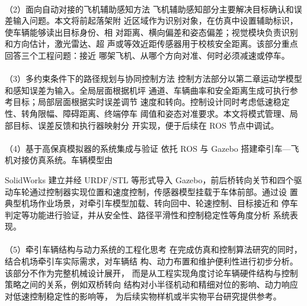 \paragraph{} （2）面向自动对接的飞机辅助感知方法
飞机辅助感知部分主要解决目标确认和误差输入问题。本文将前起落架附
近区域作为识别对象，在仿真中设置辅助标识，使车辆能够读出目标身份、相
对距离、横向偏差和姿态偏差；视觉模块负责识别和方向估计，激光雷达、超
声或等效近距传感器用于校核安全距离。该部分重点回答三个工程问题：接近
哪架飞机、从哪个方向对准、何时必须减速或停车。
\paragraph{} （3）多约束条件下的路径规划与协同控制方法
控制方法部分以第二章运动学模型和感知误差为输入。全局层面根据机坪
通道、车辆曲率和安全距离生成可执行参考目标；局部层面根据实时误差调节
速度和转向。控制设计同时考虑低速稳定性、转角限幅、障碍距离、终端停车
阈值和姿态对准要求。本文将模式管理、局部目标、误差反馈和执行器映射分
开实现，便于后续在 ROS 节点中调试。




\paragraph{} （4）基于高保真模拟器的系统集成与验证
依托 ROS 与 Gazebo 搭建牵引车—飞机对接仿真系统。车辆模型由








SolidWorks 建立并经 URDF/STL 等形式导入 Gazebo，前后桥转向关节和四个驱
动车轮通过控制器实现位置和速度控制，传感器模型挂载于车体前部。通过设
置典型机场作业场景，对牵引车模型加载、转向回中、轮速控制、目标接近和
停车判定等功能进行验证，并从安全性、路径平滑性和控制稳定性等角度分析
系统表现。
\paragraph{} （5）牵引车辆结构与动力系统的工程化思考
在完成仿真和控制算法研究的同时，结合机场牵引车实际需求，对车辆结
构、动力布置和维护便利性进行初步分析。该部分不作为完整机械设计展开，
而是从工程实现角度讨论车辆硬件结构与控制策略之间的关系，例如双桥转向
结构对小半径机动和精细对位的影响、动力响应对低速控制稳定性的影响等，
为后续实物样机或半实物平台研究提供参考。


